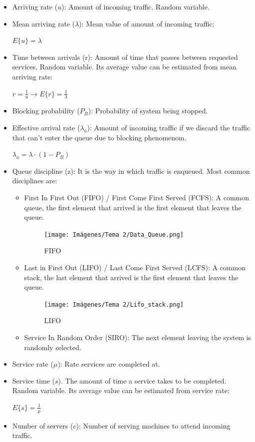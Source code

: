 \documentclass[
	12pt,
	twoside
]{book}
\begin{document}
\begin{itemize}
	\item Arriving rate ($u$): Amount of incoming traffic. Random variable.
	\item {
		Mean arriving rate ($\lambda$): Mean value of amount of incoming traffic:

		$ E\{u\} = \lambda $
	}
	\item {
		Time between arrivals (r): Amount of time that passes between requested services. Random variable. Its average value can be estimated from mean arriving rate:

		$ r = \frac{1}{u} \rightarrow E\{r\} = \frac{1}{\lambda} $
	}
	\item Blocking probability ($P_B$): Probability of system being stopped.
	\item {
		Effective arrival rate ($\lambda_a$): Amount of incoming traffic if we discard the traffic that can't enter the queue due to blocking phenomenom.

		$ \lambda_a = \lambda \cdot ( 1 - P_B ) $
	}
	\item {
		Queue discipline (z): It is the way in which traffic is enqueued. Most common disciplines are:

		\begin{itemize}
			\item {
				First In First Out (FIFO) / First Come First Served (FCFS): A common queue, the first element that arrived is the first element that leaves the queue.

				\begin{figure}[H]
					\centering
					\texttt{[image: Imágenes/Tema 2/Data\_Queue.png]}
					\caption{
						\label{fig:unit2_fifo}
						FIFO
					}
				\end{figure}
			}
			\item {
				Last in First Out (LIFO) / Last Come First Served (LCFS): A common stack, the last element that arrived is the first element that leaves the queue.

				\begin{figure}[H]
					\centering
					\texttt{[image: Imágenes/Tema 2/Lifo\_stack.png]}
					\caption{
						\label{fig:unit2_lifo}
						LIFO
					}
				\end{figure}
			}
			\item Service In Random Order (SIRO): The next element leaving the system is randomly selected.
		\end{itemize}
	}
	\item Service rate ($\mu$): Rate services are completed at.
	\item {
		Service time ($s$). The amount of time a service takes to be completed. Random variable. Its average value can be estimated from service rate:

		$ E\{s\} = \frac{1}{\mu} $
	}
	\item Number of servers ($c$): Number of serving machines to attend incoming traffic.
\end{itemize}
\end{document}
